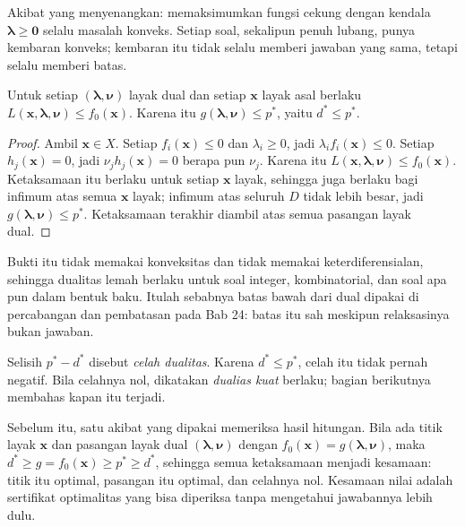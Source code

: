 Akibat yang menyenangkan: memaksimumkan fungsi cekung dengan kendala
$\boldsymbol{\lambda}\ge\mathbf{0}$ selalu masalah konveks. Setiap soal, sekalipun penuh
lubang, punya kembaran konveks; kembaran itu tidak selalu memberi jawaban yang sama,
tetapi selalu memberi batas.

\begin{teorema}
Untuk setiap $(\boldsymbol{\lambda},\boldsymbol{\nu})$ layak dual dan setiap $\mathbf{x}$
layak asal berlaku $L(\mathbf{x},\boldsymbol{\lambda},\boldsymbol{\nu})\le
f_{0}(\mathbf{x})$. Karena itu $g(\boldsymbol{\lambda},\boldsymbol{\nu})\le p^{*}$,
yaitu $d^{*}\le p^{*}$.
\end{teorema}

\begin{proof}
Ambil $\mathbf{x}\in X$. Setiap $f_{i}(\mathbf{x})\le0$ dan $\lambda_{i}\ge0$, jadi
$\lambda_{i}f_{i}(\mathbf{x})\le0$. Setiap $h_{j}(\mathbf{x})=0$, jadi
$\nu_{j}h_{j}(\mathbf{x})=0$ berapa pun $\nu_{j}$. Karena itu
$L(\mathbf{x},\boldsymbol{\lambda},\boldsymbol{\nu})\le f_{0}(\mathbf{x})$. Ketaksamaan
itu berlaku untuk setiap $\mathbf{x}$ layak, sehingga juga berlaku bagi infimum atas
semua $\mathbf{x}$ layak; infimum atas seluruh $D$ tidak lebih besar, jadi
$g(\boldsymbol{\lambda},\boldsymbol{\nu})\le p^{*}$. Ketaksamaan terakhir diambil atas
semua pasangan layak dual.
\end{proof}

Bukti itu tidak memakai konveksitas dan tidak memakai keterdiferensialan, sehingga
dualitas lemah berlaku untuk soal integer, kombinatorial, dan soal apa pun dalam bentuk
baku. Itulah sebabnya batas bawah dari dual dipakai di percabangan dan pembatasan pada
Bab 24: batas itu sah meskipun relaksasinya bukan jawaban.

Selisih $p^{*}-d^{*}$ disebut \emph{celah dualitas}. Karena
$d^{*}\le p^{*}$, celah itu tidak pernah negatif. Bila celahnya nol, dikatakan
\emph{dualias kuat} berlaku; bagian berikutnya membahas kapan itu terjadi.

Sebelum itu, satu akibat yang dipakai memeriksa hasil hitungan. Bila ada titik layak
$\mathbf{x}$ dan pasangan layak dual $(\boldsymbol{\lambda},\boldsymbol{\nu})$ dengan
$f_{0}(\mathbf{x})=g(\boldsymbol{\lambda},\boldsymbol{\nu})$, maka
$d^{*}\ge g=f_{0}(\mathbf{x})\ge p^{*}\ge d^{*}$, sehingga semua ketaksamaan menjadi
kesamaan: titik itu optimal, pasangan itu optimal, dan celahnya nol. Kesamaan nilai adalah
sertifikat optimalitas yang bisa diperiksa tanpa mengetahui jawabannya lebih dulu.

